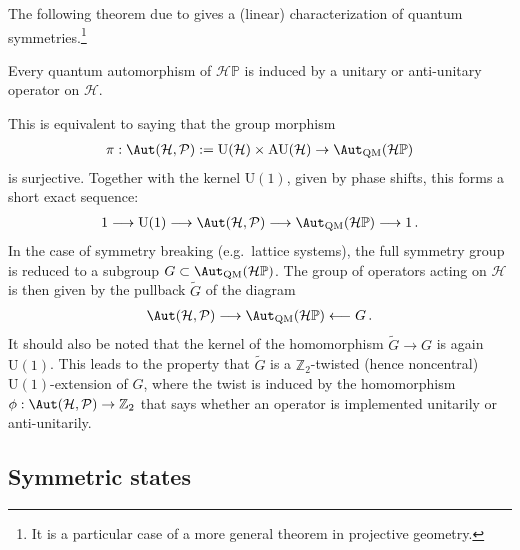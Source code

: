     The following theorem due to  gives a (linear) characterization of quantum symmetries.\footnote{It is a particular case of a more general theorem in projective geometry.}
    \begin{theorem}[Wigner]
        Every quantum automorphism of $\mathcal{H}\mathbb{P}$ is induced by a unitary or anti-unitary operator on $\mathcal{H}$.
    \end{theorem}
    This is equivalent to saying that the group morphism
    \begin{gather}
        \pi:\Aut(\mathcal{H},\mathcal{P}):=\mathrm{U}(\mathcal{H})\times\mathrm{AU}(\mathcal{H})\rightarrow\Aut_{\text{QM}}(\mathcal{H}\mathbb{P})
    \end{gather}
    is surjective. Together with the kernel $\mathrm{U}(1)$, given by phase shifts, this forms a short exact sequence:
    \begin{gather}
        1\longrightarrow\mathrm{U}(1)\longrightarrow\Aut(\mathcal{H},\mathcal{P})\longrightarrow\Aut_{\text{QM}}(\mathcal{H}\mathbb{P})\longrightarrow1\,.
    \end{gather}
    In the case of symmetry breaking (e.g.~lattice systems), the full symmetry group is reduced to a subgroup $G\subset\Aut_{\text{QM}}(\mathcal{H}\mathbb{P})$. The group of operators acting on $\mathcal{H}$ is then given by the pullback $\widetilde{G}$ of the diagram
    \begin{gather}
        \Aut(\mathcal{H},\mathcal{P})\longrightarrow\Aut_{\text{QM}}(\mathcal{H}\mathbb{P})\longleftarrow G\,.
    \end{gather}
    It should also be noted that the kernel of the homomorphism $\widetilde{G}\rightarrow G$ is again $\mathrm{U}(1)$. This leads to the property that $\widetilde{G}$ is a $\mathbb{Z}_2$-twisted (hence noncentral) $\mathrm{U}(1)$-extension of $G$, where the twist is induced by the homomorphism $\phi:\Aut(\mathcal{H},\mathcal{P})\rightarrow\mathbb{Z}_2$ that says whether an operator is implemented unitarily or anti-unitarily.


\subsection{Symmetric states}

